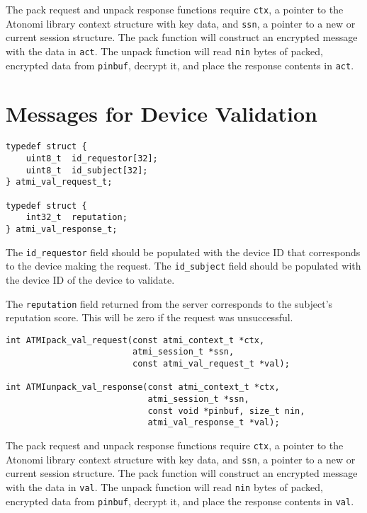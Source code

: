 The pack request and unpack response functions require \texttt{ctx}, a pointer
to the Atonomi library context structure with key data, and \texttt{ssn},
a pointer to a new or current session structure. The pack function will
construct an encrypted message with the data in \texttt{act}. The unpack function
will read \texttt{nin} bytes of packed, encrypted data from \texttt{pinbuf},
decrypt it, and place the response contents in \texttt{act}.



\section{Messages for Device Validation}
\begin{lstlisting}[name=Validation Request and Response Structures]
typedef struct {
	uint8_t  id_requestor[32];
	uint8_t  id_subject[32];
} atmi_val_request_t;

typedef struct {
	int32_t  reputation;
} atmi_val_response_t;
\end{lstlisting}

The \texttt{id_requestor} field should be populated with the device ID that
corresponds to the device making the request. The \texttt{id_subject} field
should be populated with the device ID of the device to validate.

The \texttt{reputation} field returned from the server corresponds to the
subject's reputation score. This will be zero if the request was unsuccessful.

\begin{lstlisting}[name=Validation Request Packing and Response Unpacking Functions]
int ATMIpack_val_request(const atmi_context_t *ctx,
                         atmi_session_t *ssn,
                         const atmi_val_request_t *val);

int ATMIunpack_val_response(const atmi_context_t *ctx,
                            atmi_session_t *ssn,
                            const void *pinbuf, size_t nin,
                            atmi_val_response_t *val);
\end{lstlisting}

The pack request and unpack response functions require \texttt{ctx}, a pointer
to the Atonomi library context structure with key data, and \texttt{ssn},
a pointer to a new or current session structure. The pack function will
construct an encrypted message with the data in \texttt{val}. The unpack function
will read \texttt{nin} bytes of packed, encrypted data from \texttt{pinbuf},
decrypt it, and place the response contents in \texttt{val}.


